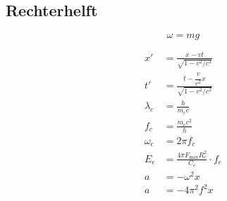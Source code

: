 \documentclass[11pt,a4paper]{article}
\begin{document}
\begin{minipage}[t]{0.48\textwidth}
\subsection*{Rechterhelft}

\[
\omega = mg
\]

\begin{align*}
x' &= \frac{x-vt}{\sqrt{1-v^2/c^2}}
\\[0.4em]
t' &= \frac{t-\dfrac{v}{c^2}x}{\sqrt{1-v^2/c^2}}
\\[0.6em]
\lambda_e &= \frac{h}{m_e c}
\\
f_c &= \frac{m_e c^2}{h}
\\
\omega_c &= 2\pi f_c
\\[0.6em]
E_e &= \frac{4\pi F_{\max} R_c^2}{C_e}\cdot f_e
\\[0.6em]
a &= -\omega^2 x
\\
a &= -4\pi^2 f^2 x
\end{align*}
\end{minipage}
\end{document}
